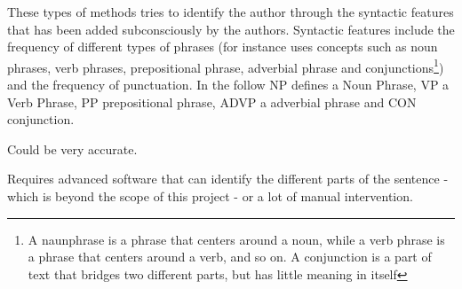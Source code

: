 {\label{syntactic}
These types of methods tries to identify the author through the syntactic features that has been added subconsciously by the authors. Syntactic features include the frequency of different types of phrases (for instance \cite{style} uses concepts such as noun phrases, verb phrases, prepositional phrase, adverbial phrase and conjunctions\footnote{A naunphrase is a phrase that centers around a noun, while a verb phrase is a phrase that centers around a verb, and so on. A conjunction is a part of text that bridges two different parts, but has little meaning in itself}) and the frequency of punctuation.
} 
{
In the follow NP defines a Noun Phrase, VP a Verb Phrase, PP prepositional phrase, ADVP a adverbial phrase and CON conjunction.\\
}
{
\item Could be very accurate.
}{
\item Requires advanced software that can identify the different parts of the sentence - which is beyond the scope of this project - or a lot of manual intervention.
}

